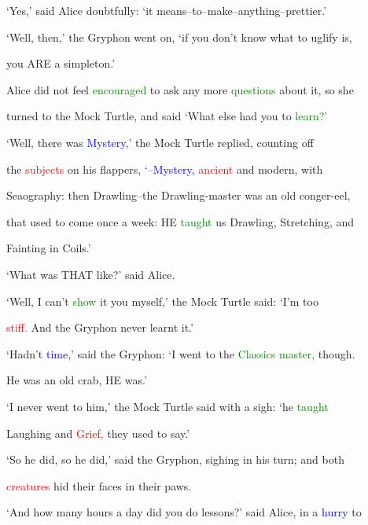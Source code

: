  ‘Yes,’ said Alice doubtfully: ‘it means--to--make--anything--prettier.’



 ‘Well, then,’ the Gryphon went on, ‘if you don’t know what to uglify is,

 you ARE a simpleton.’



 Alice did not feel \textcolor{green}{encouraged} to ask any more \textcolor{green}{questions} about it, so she

 turned to the Mock Turtle, and said ‘What else had you to \textcolor{green}{learn?’}



 ‘Well, there was \textcolor{blue}{Mystery,’} the Mock Turtle replied, counting off

 the \textcolor{red}{subjects} on his flappers, \textcolor{blue}{‘--Mystery,} \textcolor{red}{ancient} and modern, with

 Seaography: then Drawling--the Drawling-master was an old conger-eel,

 that used to come once a week: HE \textcolor{green}{taught} us Drawling, Stretching, and

 \textcolor{BurntOrange}{Fainting} in Coils.’



 ‘What was THAT like?’ said Alice.



 ‘Well, I can’t \textcolor{green}{show} it you myself,’ the Mock Turtle said: ‘I’m too

 \textcolor{red}{stiff.} And the Gryphon never learnt it.’



 ‘Hadn’t \textcolor{blue}{time,’} said the Gryphon: ‘I went to the \textcolor{green}{Classics} \textcolor{green}{master,} though.

 He was an old crab, HE was.’



 ‘I never went to him,’ the Mock Turtle said with a sigh: ‘he \textcolor{green}{taught}

 \textcolor{BurntOrange}{Laughing} and \textcolor{red}{Grief,} they used to say.’



 ‘So he did, so he did,’ said the Gryphon, sighing in his turn; and both

 \textcolor{red}{creatures} hid their faces in their paws.



 ‘And how many hours a day did you do \textcolor{BurntOrange}{lessons?’} said Alice, in a \textcolor{blue}{hurry} to

